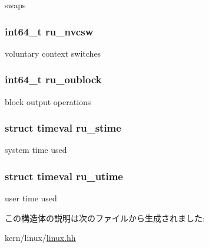 swaps \hypertarget{structLinux_1_1rusage_a488b8289bbd360fe61edb0bc26ccdb4d}{
\subsubsection[{ru\_\-nvcsw}]{\setlength{\rightskip}{0pt plus 5cm}int64\_\-t {\bf ru\_\-nvcsw}}}
\label{structLinux_1_1rusage_a488b8289bbd360fe61edb0bc26ccdb4d}


voluntary context switches \hypertarget{structLinux_1_1rusage_a15fb59113ce07eadb77fd013deda9ed6}{
\subsubsection[{ru\_\-oublock}]{\setlength{\rightskip}{0pt plus 5cm}int64\_\-t {\bf ru\_\-oublock}}}
\label{structLinux_1_1rusage_a15fb59113ce07eadb77fd013deda9ed6}


block output operations \hypertarget{structLinux_1_1rusage_a15f836efd7b69c0a0eb19f5d9505e3e9}{
\subsubsection[{ru\_\-stime}]{\setlength{\rightskip}{0pt plus 5cm}struct {\bf timeval} {\bf ru\_\-stime}}}
\label{structLinux_1_1rusage_a15f836efd7b69c0a0eb19f5d9505e3e9}


system time used \hypertarget{structLinux_1_1rusage_a40e27c5d4340b0c6532787d6740b22ab}{
\subsubsection[{ru\_\-utime}]{\setlength{\rightskip}{0pt plus 5cm}struct {\bf timeval} {\bf ru\_\-utime}}}
\label{structLinux_1_1rusage_a40e27c5d4340b0c6532787d6740b22ab}


user time used 

この構造体の説明は次のファイルから生成されました:\begin{DoxyCompactItemize}
\item 
kern/linux/\hyperlink{kern_2linux_2linux_8hh}{linux.hh}\end{DoxyCompactItemize}
